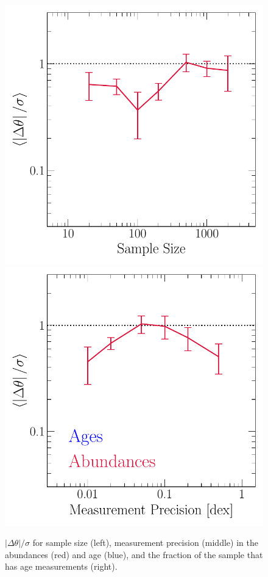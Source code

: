 \documentclass[ms.tex]{subfiles}
\begin{document}
\begin{figure}
\centering
\includegraphics[scale = 0.45]{dp_sigma_samplesize.pdf}
\includegraphics[scale = 0.45]{dp_sigma_precision.pdf}
\caption{
$\left|\Delta\theta\right|/\sigma$ for sample size (left), measurement
precision (middle) in the abundances (red) and age (blue), and the fraction of
the sample that has age measurements (right).
}
\label{fig:dp_sigma}
\end{figure}
\end{document}
